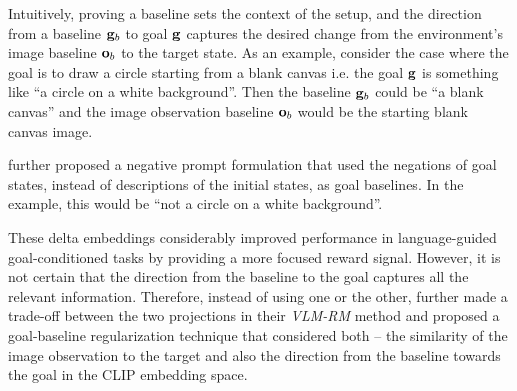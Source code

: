 Intuitively, proving a baseline sets the context of the setup, and the direction from a baseline \(\mathbf{g}_b\) to goal \(\mathbf{g}\) captures the desired change from the environment's image baseline \(\mathbf{o}_b\) to the target state.
As an example, consider the case where the goal is to draw a circle starting from a blank canvas i.e. the goal \(\mathbf{g}\) is something like ``a circle on a white background''.
Then the baseline \(\mathbf{g}_b\) could be ``a blank canvas'' and the image observation baseline \(\mathbf{o}_b\) would be the starting blank canvas image.

\cite{negprompt} further proposed a negative prompt formulation that used the negations of goal states, instead of descriptions of the initial states, as goal baselines.
In the example, this would be ``not a circle on a white background''.

These delta embeddings considerably improved performance in language-guided goal-conditioned tasks by providing a more focused reward signal.
However, it is not certain that the direction from the baseline to the goal captures all the relevant information.
Therefore, instead of using one or the other, \cite{vlmrm} further made a trade-off between the two projections in their \emph{VLM-RM} method and proposed a goal-baseline regularization technique that considered both -- the similarity of the image observation to the target and also the direction from the baseline towards the goal in the CLIP embedding space.

